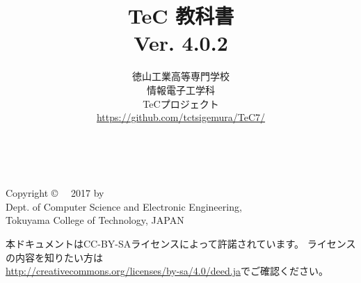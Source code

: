\documentclass[a4paper,twocolumn,twoside,dvipdfmx]{jsbook}
\begin{document}
\frontmatter
\title{TeC 教科書\\Ver. 4.0.2}
\author{徳山工業高等専門学校\\情報電子工学科\\TeCプロジェクト\\
\url{https://github.com/tctsigemura/TeC7/}}
\date{}

\maketitle

\thispagestyle{empty}
\onecolumn
~
\vfill
\begin{flushleft}
Copyright \copyright ~~ 2017 by \\
Dept. of Computer Science and Electronic Engineering, \\
Tokuyama College of Technology, JAPAN
\end{flushleft}

\vspace{0.8cm}
本ドキュメントはCC-BY-SAライセンスによって許諾されています。
ライセンスの内容を知りたい方は\\
\url{http://creativecommons.org/licenses/by-sa/4.0/deed.ja}でご確認ください。

\setcounter{tocdepth}{2}
\tableofcontents

\twocolumn
\mainmatter

\appendix

\backmatter
\pagestyle{empty}
\onecolumn
~
\vfill\vfill\vfill
\begin{center}
\end{center}
\vfill
\end{document}
